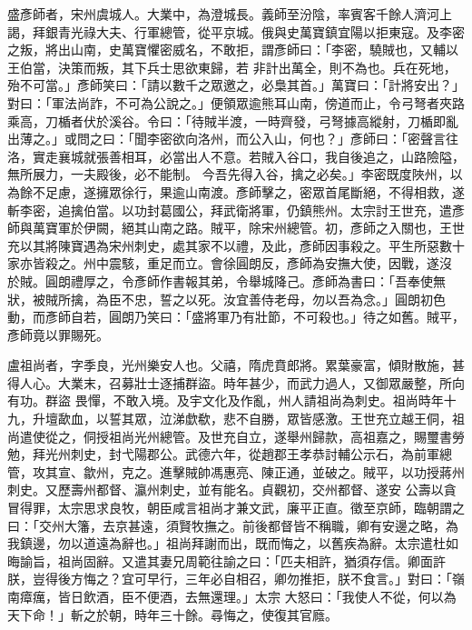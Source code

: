 \begin{pinyinscope}
 盛彥師者，宋州虞城人。大業中，為澄城長。義師至汾陰，率賓客千餘人濟河上謁，拜銀青光祿大夫、行軍總管，從平京城。俄與史萬寶鎮宜陽以拒東寇。及李密之叛，將出山南，史萬寶懼密威名，不敢拒，謂彥師曰：「李密，驍賊也，又輔以王伯當，決策而叛，其下兵士思欲東歸，若
 非計出萬全，則不為也。兵在死地，殆不可當。」彥師笑曰：「請以數千之眾邀之，必梟其首。」萬寶曰：「計將安出？」對曰：「軍法尚詐，不可為公說之。」便領眾逾熊耳山南，傍道而止，令弓弩者夾路乘高，刀楯者伏於溪谷。令曰：「待賊半渡，一時齊發，弓弩據高縱射，刀楯即亂出薄之。」或問之曰：「聞李密欲向洛州，而公入山，何也？」彥師曰：「密聲言往洛，實走襄城就張善相耳，必當出人不意。若賊入谷口，我自後追之，山路險隘，無所展力，一夫殿後，必不能制。
 今吾先得入谷，擒之必矣。」李密既度陜州，以為餘不足慮，遂擁眾徐行，果逾山南渡。彥師擊之，密眾首尾斷絕，不得相救，遂斬李密，追擒伯當。以功封葛國公，拜武衛將軍，仍鎮熊州。太宗討王世充，遣彥師與萬寶軍於伊闕，絕其山南之路。賊平，除宋州總管。初，彥師之入關也，王世充以其將陳寶遇為宋州刺史，處其家不以禮，及此，彥師因事殺之。平生所惡數十家亦皆殺之。州中震駭，重足而立。會徐圓朗反，彥師為安撫大使，因戰，遂沒
 於賊。圓朗禮厚之，令彥師作書報其弟，令舉城降己。彥師為書曰：「吾奉使無狀，被賊所擒，為臣不忠，誓之以死。汝宜善侍老母，勿以吾為念。」圓朗初色動，而彥師自若，圓朗乃笑曰：「盛將軍乃有壯節，不可殺也。」待之如舊。賊平，彥師竟以罪賜死。



 盧祖尚者，字季良，光州樂安人也。父禧，隋虎賁郎將。累葉豪富，傾財散施，甚得人心。大業末，召募壯士逐捕群盜。時年甚少，而武力過人，又御眾嚴整，所向有功。群盜
 畏憚，不敢入境。及宇文化及作亂，州人請祖尚為刺史。祖尚時年十九，升壇歃血，以誓其眾，泣涕歔欷，悲不自勝，眾皆感激。王世充立越王侗，祖尚遣使從之，侗授祖尚光州總管。及世充自立，遂舉州歸款，高祖嘉之，賜璽書勞勉，拜光州刺史，封弋陽郡公。武德六年，從趙郡王孝恭討輔公示石，為前軍總管，攻其宣、歙州，克之。進擊賊帥馮惠亮、陳正通，並破之。賊平，以功授蔣州刺史。又歷壽州都督、瀛州刺史，並有能名。貞觀初，交州都督、遂安
 公壽以貪冒得罪，太宗思求良牧，朝臣咸言祖尚才兼文武，廉平正直。徵至京師，臨朝謂之曰：「交州大籓，去京甚遠，須賢牧撫之。前後都督皆不稱職，卿有安邊之略，為我鎮邊，勿以道遠為辭也。」祖尚拜謝而出，既而悔之，以舊疾為辭。太宗遣杜如晦諭旨，祖尚固辭。又遣其妻兄周範往諭之曰：「匹夫相許，猶須存信。卿面許朕，豈得後方悔之？宜可早行，三年必自相召，卿勿推拒，朕不食言。」對曰：「嶺南瘴癘，皆日飲酒，臣不便酒，去無還理。」太宗
 大怒曰：「我使人不從，何以為天下命！」斬之於朝，時年三十餘。尋悔之，使復其官廕。




\end{pinyinscope}
